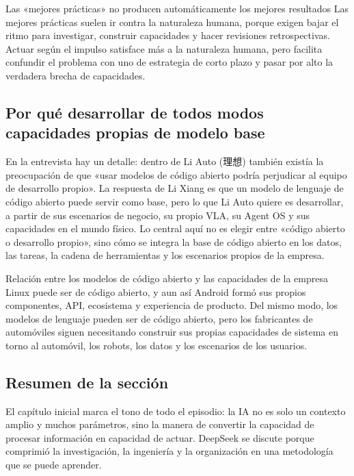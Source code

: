 \documentclass[a4paper]{article}
\begin{document}
\begin{warningbox}{Las «mejores prácticas» no producen automáticamente los mejores resultados}
Las mejores prácticas suelen ir contra la naturaleza humana, porque exigen bajar el ritmo para investigar, construir capacidades y hacer revisiones retrospectivas. Actuar según el impulso satisface más a la naturaleza humana, pero facilita confundir el problema con uno de estrategia de corto plazo y pasar por alto la verdadera brecha de capacidades.
\end{warningbox}

\subsection{Por qué desarrollar de todos modos capacidades propias de modelo base}

En la entrevista hay un detalle: dentro de Li Auto (理想) también existía la preocupación de que «usar modelos de código abierto podría perjudicar al equipo de desarrollo propio». La respuesta de Li Xiang es que un modelo de lenguaje de código abierto puede servir como base, pero lo que Li Auto quiere es desarrollar, a partir de sus escenarios de negocio, su propio VLA, su Agent OS y sus capacidades en el mundo físico. Lo central aquí no es elegir entre «código abierto o desarrollo propio», sino cómo se integra la base de código abierto en los datos, las tareas, la cadena de herramientas y los escenarios propios de la empresa.

\begin{knowledgebox}{Relación entre los modelos de código abierto y las capacidades de la empresa}
Linux puede ser de código abierto, y aun así Android formó sus propios componentes, API, ecosistema y experiencia de producto. Del mismo modo, los modelos de lenguaje pueden ser de código abierto, pero los fabricantes de automóviles siguen necesitando construir sus propias capacidades de sistema en torno al automóvil, los robots, los datos y los escenarios de los usuarios.
\end{knowledgebox}

\subsection{Resumen de la sección}

El capítulo inicial marca el tono de todo el episodio: la IA no es solo un contexto amplio y muchos parámetros, sino la manera de convertir la capacidad de procesar información en capacidad de actuar. DeepSeek se discute porque comprimió la investigación, la ingeniería y la organización en una metodología que se puede aprender.
\end{document}
